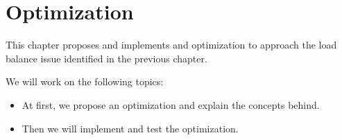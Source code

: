 \chapter{Optimization}

This chapter proposes and implements and optimization to approach the load balance issue identified in the previous chapter.

We will work on the following topics:
\begin{itemize}
  \item At first, we propose an optimization and explain the concepts behind.
  \item Then we will implement and test the optimization.
\end{itemize}






